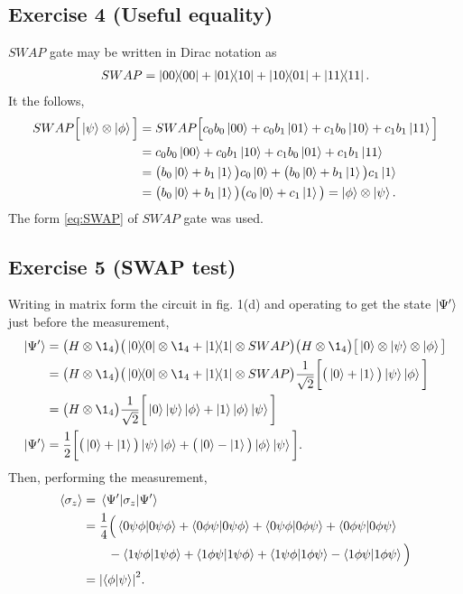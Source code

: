 \subsection{Exercise 4 (Useful equality)}
$SWAP$ gate may be written in Dirac notation as
\begin{align}\label{eq:SWAP}
SWAP=\dyad{00}{00}+\dyad{01}{10}+\dyad{10}{01}+\dyad{11}{11}.
\end{align}
It the follows,
\begin{subequations}
\begin{align}
SWAP\Big[ \ket{\psi	}\otimes \ket{\phi}\Big]&=
	SWAP\Big[ c_0b_0\ket{00}+c_0b_1\ket{01}+c_1b_0\ket{10}+c_1b_1\ket{11} \Big]\\
&=c_0b_0\ket{00}+c_0b_1\ket{10}+c_1b_0\ket{01}+c_1b_1\ket{11}\\
&=\big( b_0\ket{0}+b_1\ket{1} \big)c_0\ket{0}+
	\big( b_0\ket{0}+b_1\ket{1} \big)c_1\ket{1}\\
&=\big( b_0\ket{0}+b_1\ket{1} \big)\big( c_0\ket{0}+c_1\ket{1}\big)
=\ket{\phi}\otimes\ket{\psi}.
\end{align}
\end{subequations}
The form \eqref{eq:SWAP} of $SWAP$ gate was used.

\subsection{Exercise 5 (SWAP test)}\noindent
Writing in matrix form the circuit in fig. 1(d) and operating to get 
the state $\ket{\Psi'}$ just before the measurement,
\begin{subequations}
\begin{align}
\ket{\Psi'}&=\big( H\otimes\1_4 \big)	
	\big( \dyad{0}{0}\otimes\1_4+\dyad{1}{1}\otimes SWAP \big)
		\big(H\otimes\1_4 \big)\big[ \ket{0}\otimes\ket{\psi}\otimes\ket{\phi} \big]\\
&=\big( H\otimes\1_4 \big)	
	\big( \dyad{0}{0}\otimes\1_4+\dyad{1}{1}\otimes SWAP \big)
		\frac{1}{\sqrt{2}}\bigg[ \big(\ket{0}+\ket{1} \big)\ket{\psi}\ket{\phi} \bigg]\\
&=\big( H\otimes\1_4 \big)	
	\frac{1}{\sqrt{2}}\bigg[ \ket{0}\dket{\psi}{\phi}+\ket{1}\dket{\phi}{\psi} \bigg]\\
\ket{\Psi'}&=\frac{1}{2}\bigg[\big( \ket{0}+\ket{1} \big)\dket{\psi}{\phi} +
	\big( \ket{0}-\ket{1} \big)\dket{\phi}{\psi} \bigg].
\end{align}
\end{subequations}
Then, performing the measurement,
\begin{subequations}
\begin{align}
\expval{\sigma_z}&=\matrixel{\Psi'}{\sigma_z}{\Psi'}\\
&=\frac{1}{4}\Big( \braket{0\psi\phi}{0\psi\phi}+\braket{0\phi\psi}{0\psi\phi}
+\braket{0\psi\phi}{0\phi\psi}+\braket{0\phi\psi}{0\phi\psi}\\
&\qquad
 -\braket{1\psi\phi}{1\psi\phi}+\braket{1\phi\psi}{1\psi\phi}+
\braket{1\psi\phi}{1\phi\psi}-\braket{1\phi\psi}{1\phi\psi}
\Big)\\
&=\abs{\braket{\phi}{\psi}}^2.
\end{align}
\end{subequations}

